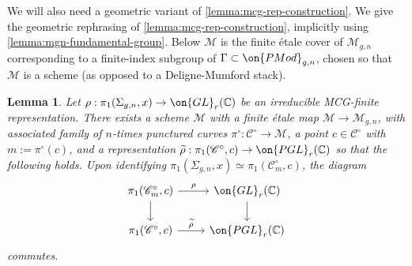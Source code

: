 \documentclass[12 pt]{amsart}
\theoremstyle{plain}
\newtheorem{lemma}[subsubsection]{Lemma}
\theoremstyle{definition}
\theoremstyle{remark}
\numberwithin{equation}{section}
\begin{document}
We will also need a geometric variant of \autoref{lemma:mcg-rep-construction}.
We give the geometric rephrasing of \autoref{lemma:mcg-rep-construction},
implicitly using \autoref{lemma:mgn-fundamental-group}. Below $\mathscr{M}$ is
the finite \'etale cover of $\mathscr{M}_{g,n}$ corresponding to a finite-index subgroup of $\Gamma\subset \on{PMod}_{g,n}$, chosen so that $\mathscr{M}$ is a scheme (as opposed to a Deligne-Mumford stack).

\begin{lemma}
	\label{lemma:geometric-mcg-rep-construction}
	Let
	$\rho: \pi_1(\Sigma_{g,n},x) \to \on{GL}_r(\mathbb C)$ be an irreducible MCG-finite representation. 
	There exists a scheme $\mathscr M$ with a finite \'etale map $\mathscr M \to \mathscr
	M_{g,n}$, with associated family of $n$-times punctured curves $\pi^\circ: \mathscr{C}^\circ\to \mathscr{M}$, a point $c\in \mathscr{C}^\circ$ with $m:=\pi^\circ(c)$,
	and a representation $\widetilde{\rho}: \pi_1(\mathscr C^\circ, c) \to
	\on{PGL}_r(\mathbb C)$ so that the following holds. Upon identifying
	$\pi_1(\Sigma_{g,n},x)  \simeq \pi_1(\mathscr C^\circ_m,c)$, the diagram
	\begin{equation}
		\label{equation:geometric-rho-and-tilde-rho}
		\begin{tikzcd} 
			\pi_1(\mathscr C^\circ_m,c)  \ar[r, "\rho"] \ar {d} &
			 \on{GL}_r(\mathbb C) \ar {d} \\
			 \pi_1(\mathscr C^\circ, c) \ar[r, "\widetilde\rho"]& \on{PGL}_r(\mathbb C)
	\end{tikzcd}\end{equation}
	commutes.
\end{lemma}
\end{document}
